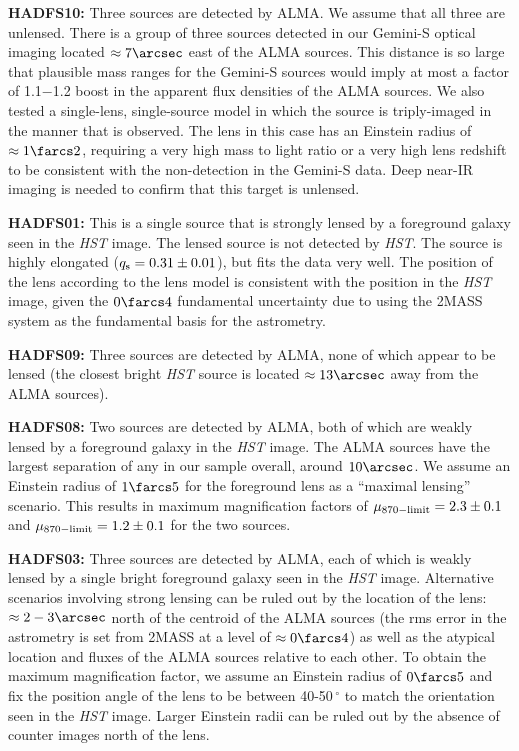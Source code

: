 \documentclass[iop]{emulateapj}
\begin{document}
{\bf HADFS10:} Three sources are detected by ALMA.  We assume that all three
are unlensed.  There is a group of three sources detected in our Gemini-S
optical imaging located $\approx 7\arcsec$ east of the ALMA sources.  This
distance is so large that plausible mass ranges for the Gemini-S sources would
imply at most a factor of 1.1$-$1.2 boost in the apparent flux densities of the
ALMA sources.  We also tested a single-lens, single-source model in which the
source is triply-imaged in the manner that is observed.  The lens in this case
has an Einstein radius of $\approx 1\farcs2$, requiring a very high mass to
light ratio or a very high lens redshift to be consistent with the
non-detection in the Gemini-S data.  Deep near-IR imaging is needed to confirm
that this target is unlensed.

{\bf HADFS01:} This is a single source that is strongly lensed by a foreground
galaxy seen in the {\it HST} image.  The lensed source is not detected by {\it
HST}.  The source is highly elongated ($q_{\rm s} = 0.31 \pm 0.01$), but fits the
data very well.  The position of the lens according to the lens model is
consistent with the position in the {\it HST} image, given the $0\farcs4$
fundamental uncertainty due to using the 2MASS system as the fundamental basis
for the astrometry.

{\bf HADFS09:} Three sources are detected by ALMA, none of which appear to be
lensed (the closest bright {\it HST} source is located $\approx 13\arcsec$ away
from the ALMA sources).

{\bf HADFS08:} Two sources are detected by ALMA, both of which are weakly
lensed by a foreground galaxy in the {\it HST} image.  The ALMA sources have
the largest separation of any in our sample overall, around $10\arcsec$.  We
assume an Einstein radius of $1\farcs5$ for the foreground lens as a ``maximal
lensing'' scenario.  This results in maximum magnification factors of $\mu_{\rm
870-limit} = 2.3 \pm 0.1$ and $\mu_{\rm 870-limit} = 1.2 \pm 0.1$ for the two
sources.

{\bf HADFS03:} Three sources are detected by ALMA, each of which is weakly
lensed by a single bright foreground galaxy seen in the {\it HST} image.
Alternative scenarios involving strong lensing can be ruled out by the location
of the lens: $\approx 2-3\arcsec$ north of the centroid of the ALMA sources
(the rms error in the astrometry is set from 2MASS at a level of $\approx
0\farcs4$) as well as the atypical location and fluxes of the ALMA sources
relative to each other.  To obtain the maximum magnification factor, we assume
an Einstein radius of $0\farcs5$ and fix the position angle of the lens to be
between 40-50$\,^\circ$ to match the orientation seen in the {\it HST} image.
Larger Einstein radii can be ruled out by the absence of counter images north
of the lens.
\end{document}

